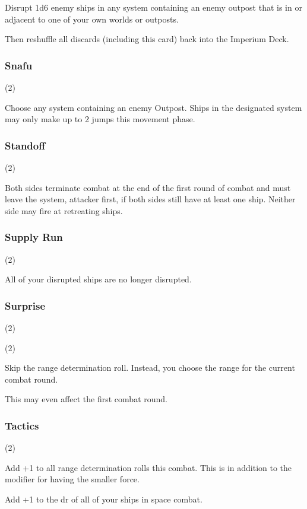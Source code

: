 
Disrupt 1d6 enemy ships in any system containing an enemy outpost that is in or adjacent to one of your own worlds or outposts.

Then reshuffle all discards (including this card) back into the Imperium Deck.

\subsubsection{Snafu} (2)


Choose any system containing an enemy Outpost. Ships in the designated system may only make up to 2 jumps this movement phase.

\subsubsection{Standoff} (2)


Both sides terminate combat at the end of the first round of combat and must leave the system, attacker first, if both sides still have at least one ship. Neither side may fire at retreating ships.

\subsubsection{Supply Run} (2)


All of your disrupted ships are no longer disrupted.

\subsubsection{Surprise} (2)

 (2)

Skip the range determination roll. Instead, you choose the range for the current combat round.

This may even affect the first combat round.

\subsubsection{Tactics} (2)

Add +1 to all range determination rolls this combat. This is in addition to the modifier for having the smaller force.

Add +1 to the dr of all of your ships in space combat.